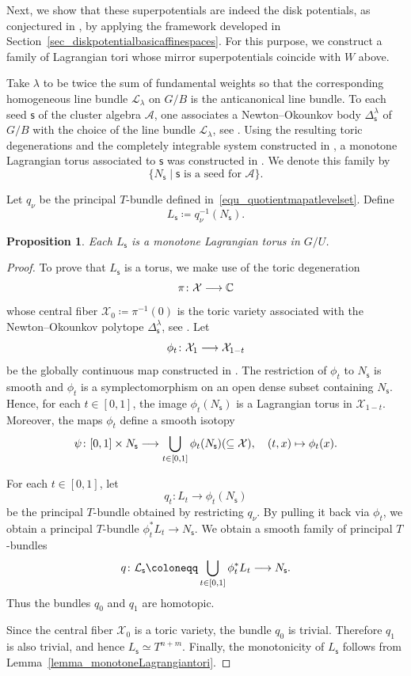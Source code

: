 \documentclass[11pt]{amsart}
\theoremstyle{plain}
\newtheorem{proposition}[theorem]{Proposition}
\theoremstyle{definition}
\theoremstyle{remark}
\newcommand{\C}{\mathbb{C}}
\numberwithin{equation}{section} \numberwithin{table}{section}
\def\to{\mathchoice{\longrightarrow}{\rightarrow}{\rightarrow}{\rightarrow}}
\numberwithin{equation}{section}
\begin{document}
Next, we show that these superpotentials are indeed the disk potentials, as conjectured in \cite{GHKK18}, by applying the framework developed in Section~\ref{sec_diskpotentialbasicaffinespaces}. For this purpose, we construct a family of Lagrangian tori whose mirror superpotentials coincide with $W$ above. 

Take $\lambda$ to be twice the sum of fundamental weights so that the corresponding homogeneous line bundle $\mathcal{L}_\lambda$ on $G/B$ is the anticanonical line bundle. To each seed $\mathsf{s}$ of the cluster algebra $\mathcal{A}$, one associates a Newton--Okounkov body $\Delta^\lambda_{\mathsf{s}}$ of $G/B$ with the choice of the line bundle $\mathcal{L}_\lambda$, see  \cite{FO25}. Using the resulting toric degenerations and the completely integrable system constructed in \cite{And13, HK15}, a monotone Lagrangian torus associated to $\mathsf{s}$ was constructed in \cite{CKKP25}. We denote this family by
$$
\{ N_\mathsf{s} \mid \mathsf{s} \mbox{ is a seed for $\mathcal{A}$}\}.
$$

Let $q_\nu$ be the principal $T$-bundle defined in~\eqref{equ_quotientmapatlevelset}. Define
$$
L_\mathsf{s} \coloneqq q^{-1}_\nu (N_\mathsf{s}).
$$

\begin{proposition}\label{proposition_toricdegtorus}
Each $L_\mathsf{s}$ is a monotone Lagrangian torus in $G/U$.
\end{proposition}

\begin{proof}
To prove that $L_\mathsf{s}$ is a torus, we make use of the toric degeneration
$$
\pi \colon \mathcal{X} \to \C
$$ 
whose central fiber $\mathcal{X}_0 \coloneqq \pi^{-1}(0)$ is the toric variety associated with the Newton--Okounkov polytope $\Delta^\lambda_{\mathsf{s}}$, see \cite{FO25}. Let 
$$
\phi_t \colon \mathcal{X}_1 \to \mathcal{X}_{1-t}
$$ 
be the globally continuous map constructed in \cite{HK15}. The restriction of $\phi_t$ to $N_{\mathsf{s}}$ is smooth and $\phi_t$ is a symplectomorphism on an open dense subset containing $N_{\mathsf{s}}$. Hence, for each $t \in [0,1]$, the image $\phi_t(N_{\mathsf{s}})$ is a Lagrangian torus in $\mathcal{X}_{1-t}$. Moreover, the maps $\phi_t$ define a smooth isotopy
$$
\psi \colon [0,1] \times {N}_{\mathsf{s}} \to \bigcup_{t \in [0,1]} \phi_t(N_\mathsf{s}) (\subseteq \mathcal{X}), \quad (t,x) \mapsto \phi_t(x).
$$

For each $t \in [0,1]$, let
$$
q_t \colon L_t \longrightarrow \phi_t(N_{\mathsf{s}})
$$
be the principal $T$-bundle obtained by restricting $q_\nu$. By pulling it back via $\phi_t$, we obtain a principal $T$-bundle $\phi_t^*L_t \longrightarrow N_{\mathsf{s}}$. We obtain a smooth family of principal $T$-bundles
$$
q \colon \mathcal{L}_\mathsf{s} \coloneqq \bigcup_{t \in [0,1]} \phi_t^* L_t \to N_\mathsf{s}.
$$
Thus the bundles $q_0$ and $q_1$ are homotopic.

Since the central fiber $\mathcal{X}_0$ is a toric variety, the bundle $q_0$ is trivial. Therefore $q_1$ is also trivial, and hence $L_\mathsf{s} \simeq T^{n+m}$. Finally, the monotonicity of $L_\mathsf{s}$ follows from Lemma~\ref{lemma_monotoneLagrangiantori}.
\end{proof}
\end{document}
